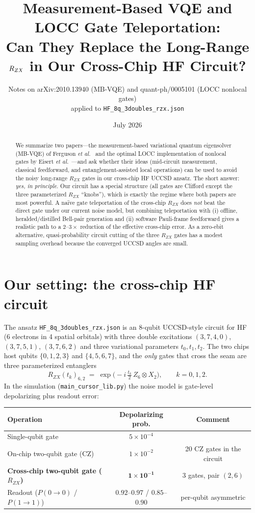 \documentclass[11pt]{article}
\title{Measurement-Based VQE and LOCC Gate Teleportation:\\
Can They Replace the Long-Range $\RZX$ in Our Cross-Chip HF Circuit?}
\author{Notes on arXiv:2010.13940 (MB-VQE) and quant-ph/0005101 (LOCC nonlocal gates)\\
applied to \texttt{HF\_8q\_3doubles\_rzx.json}}
\date{July 2026}
\newcommand{\RZX}{R_{ZX}}
\begin{document}
\maketitle

\begin{abstract}
We summarize two papers---the measurement-based variational quantum eigensolver
(MB-VQE) of Ferguson \emph{et al.}~\cite{ferguson2021} and the optimal LOCC
implementation of nonlocal gates by Eisert \emph{et al.}~\cite{eisert2000}---and
ask whether their ideas (mid-circuit measurement, classical feedforward, and
entanglement-assisted local operations) can be used to avoid the noisy
long-range $\RZX$ gates in our cross-chip HF UCCSD ansatz. The short answer:
\emph{yes, in principle}. Our circuit has a special structure (all gates are
Clifford except the three parameterized $\RZX$ ``knobs''), which is exactly the
regime where both papers are most powerful. A na\"ive gate teleportation of the
cross-chip $\RZX$ does \emph{not} beat the direct gate under our current noise
model, but combining teleportation with (i) offline, heralded/distilled Bell-pair
generation and (ii) software Pauli-frame feedforward gives a realistic path to a
$2$--$3\times$ reduction of the effective cross-chip error. As a zero-ebit
alternative, quasi-probability circuit cutting of the three $\RZX$ gates has a
modest sampling overhead because the converged UCCSD angles are small.
\end{abstract}

\section{Our setting: the cross-chip HF circuit}
\label{sec:setting}

The ansatz \texttt{HF\_8q\_3doubles\_rzx.json} is an 8-qubit UCCSD-style
circuit for HF (6 electrons in 4 spatial orbitals) with three double
excitations $(3,7,4,0)$, $(3,7,5,1)$, $(3,7,6,2)$ and three variational
parameters $t_0, t_1, t_2$. The two chips host qubits $\{0,1,2,3\}$ and
$\{4,5,6,7\}$, and the \emph{only} gates that cross the seam are three
parameterized entanglers
\[
\RZX(t_k)_{6,2} \;=\; \exp\!\Big(-i\,\tfrac{t_k}{2}\, Z_6 \otimes X_2\Big),
\qquad k = 0,1,2 .
\]
In the simulation (\texttt{main\_cursor\_lib.py}) the noise model is
gate-level depolarizing plus readout error:

\begin{center}
\begin{tabular}{lcc}
\toprule
Operation & Depolarizing prob. & Comment \\
\midrule
Single-qubit gate            & $5\times 10^{-4}$ & \\
On-chip two-qubit gate (CZ)  & $1\times 10^{-2}$ & 20 CZ gates in the circuit \\
\textbf{Cross-chip two-qubit gate ($\RZX$)} & $\mathbf{1\times 10^{-1}}$ & 3 gates, pair $(2,6)$ \\
Readout ($P(0\!\to\!0)$ / $P(1\!\to\!1)$) & $0.92$--$0.97$ / $0.85$--$0.90$ & per-qubit asymmetric \\
\bottomrule
\end{tabular}
\end{center}
\end{document}
